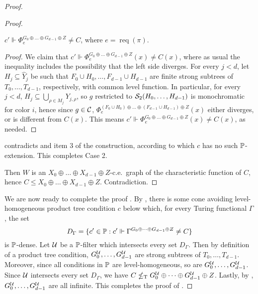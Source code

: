 \begin{proof}
\begin{proof}
	\begin{fact}\label{fact:pmtt2-level-homogeneous-case2-force-diag}
	$c' \Vdash \Phi_e^{G_0 \oplus \dots \oplus G_{d-1} \oplus Z} \neq C$, where $e = \operatorname{req}(\pi)$.
	\end{fact}
	\begin{proof}
	We claim that $c' \Vdash \Phi_e^{G_0 \oplus \dots \oplus G_{d-1} \oplus Z}(x) \neq C(x)$,
	where as usual the inequality includes the possibility that the left side diverges. For every $j < d$, let $H_j \subseteq \hat{Y}_j$ be such that 
	$F_0 \cup H_0, \dots, F_{d-1} \cup H_{d-1}$ are finite strong subtrees of $T_0, \dots, T_{d-1}$, respectively, with common level function. In particular, 
	for every $j < d$, $H_j \subseteq  \bigcup_{\rho \in M_j} Y_{j,\rho}$,
	so $g$ restricted to $\mathcal{S}_{2}({H_0, \dots, H_{d-1}})$ is monochromatic for color $i$, hence since $g \in \mathcal{C}$, $\Phi_e^{(F_0 \cup H_0) \oplus \dots \oplus (F_{d-1} \cup H_{d-1}) \oplus Z}(x)$ either diverges, or is different from $C(x)$.
	This means  $c' \Vdash \Phi_e^{G_0 \oplus \dots \oplus G_{d-1} \oplus Z}(x) \neq C(x)$, as needed.
	\end{proof}
	
	 contradicts  and item 3 of the construction, according to which $c$ has no such $\mathbb{P}$-extension. This completes Case 2.

 Then $W$ is an $X_0 \oplus \dots \oplus X_{d-1} \oplus Z$-c.e.\ graph of the characteristic function of $C$, hence $C \leq X_0 \oplus \dots \oplus X_{d-1} \oplus Z$. Contradiction.
\end{proof}

We are now ready to complete the proof .
By , there is some cone avoiding level-homogeneous product tree condition $c$ below which, for every Turing functional $\Gamma$, the set 
$$
D_\Gamma = \{ c' \in \mathbb{P}: c' \Vdash \Gamma^{G_0 \oplus \dots \oplus G_{d-1} \oplus Z} \neq C \}
$$
is $\mathbb{P}$-dense.
Let $\mathcal{U}$ be a $\mathbb{P}$-filter which intersects every set $D_\Gamma$.
Then by definition of a product tree condition, $G^{\mathcal{U}}_0, \dots, G^{\mathcal{U}}_{d-1}$ are strong subtrees of $T_0, \dots, T_{d-1}$. Moreover, since all conditions in $\mathbb{P}$ are level-homogeneous, so are $G^{\mathcal{U}}_0, \dots, G^{\mathcal{U}}_{d-1}$. Since  $\mathcal{U}$ intersects every set $D_\Gamma$, we have $C \nleq_{\text{\upshape T}} G^{\mathcal{U}}_0 \oplus \dots \oplus G^{\mathcal{U}}_{d-1} \oplus Z$.
Lastly, by , $G^{\mathcal{U}}_0, \dots, G^{\mathcal{U}}_{d-1}$ are all infinite.
This completes the proof of .
\end{proof} %

